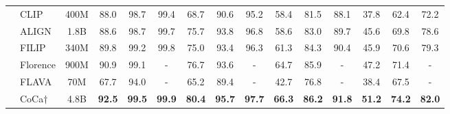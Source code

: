 \documentclass{article}
\begin{document}
\begin{table*}[]
{\begin{tabular}{@{}llccccccccccccc@{}}
\multicolumn{1}{c}{}                    & \multicolumn{1}{l|}{CLIP}        & \multicolumn{1}{c|}{400M}     & 88.0          & 98.7           & \multicolumn{1}{c|}{99.4}           & 68.7          & 90.6          & \multicolumn{1}{c|}{95.2}          & 58.4          & 81.5          & \multicolumn{1}{c|}{88.1}          & 37.8                & 62.4          & 72.2          \\
\multicolumn{1}{c}{}                    & \multicolumn{1}{l|}{ALIGN}       & \multicolumn{1}{c|}{1.8B}     & 88.6          & 98.7           & \multicolumn{1}{c|}{99.7}           & 75.7          & 93.8          & \multicolumn{1}{c|}{96.8}          & 58.6          & 83.0          & \multicolumn{1}{c|}{89.7}          & 45.6                & 69.8          & 78.6          \\
\multicolumn{1}{c}{}                    & \multicolumn{1}{l|}{FILIP}       & \multicolumn{1}{c|}{340M}     & 89.8          & 99.2           & \multicolumn{1}{c|}{99.8}           & 75.0          & 93.4          & \multicolumn{1}{c|}{96.3}          & 61.3          & 84.3          & \multicolumn{1}{c|}{90.4}          & 45.9       & 70.6          & 79.3          \\
\multicolumn{1}{c}{}                    &\multicolumn{1}{l|}{Florence} & \multicolumn{1}{c|}{900M} & 90.9 & 99.1 & \multicolumn{1}{c|}{-} & 76.7 & 93.6 & \multicolumn{1}{c|}{-} & 64.7 & 85.9 & \multicolumn{1}{c|}{-} & 47.2 & 71.4 & - \\
\multicolumn{1}{c}{}                    &\multicolumn{1}{l|}{FLAVA} & \multicolumn{1}{c|}{70M} & 67.7 & 94.0 & \multicolumn{1}{c|}{-} & 65.2 & 89.4 & \multicolumn{1}{c|}{-} & 42.7 & 76.8 & \multicolumn{1}{c|}{-} & 38.4 & 67.5 & - \\
\multicolumn{1}{c}{}                    &\multicolumn{1}{l|}{CoCa$\dagger$} & \multicolumn{1}{c|}{4.8B} & \textbf{92.5} & \textbf{99.5} & \multicolumn{1}{c|}{\textbf{99.9}} & \textbf{80.4} & \textbf{95.7} & \multicolumn{1}{c|}{\textbf{97.7}} & \textbf{66.3} & \textbf{86.2 }& \multicolumn{1}{c|}{\textbf{91.8}} & \textbf{51.2} & \textbf{74.2} &\textbf{ 82.0} \\


\end{tabular}}
\end{table*}
\end{document}
